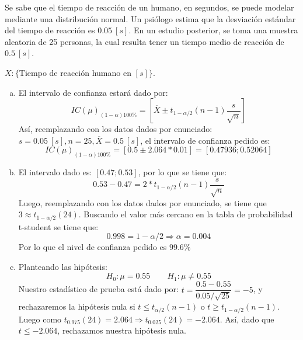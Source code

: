 
\addpoints
\question[30] Se sabe que el tiempo de reacción de un humano, en segundos, se puede modelar mediante una distribución normal. Un psiólogo estima que la desviación estándar del tiempo de reacción es $0.05\ [s]$. En un estudio posterior, se toma una muestra aleatoria de 25 personas, la cual resulta tener un tiempo medio de reacción de $0.5\ [s]$. 
\noaddpoints
{}

\begin{solution}

$X:\{$Tiempo de reacción humano en $[s]\}.$ 
\begin{enumerate}[a)]
\item El intervalo de confianza estará dado por: $$IC(\mu)_{(1-\alpha)100\%}=\left[ \overline{X}\pm t_{1-\alpha/2}(n-1)\dfrac{s}{\sqrt{n}}\right]$$ Así, reemplazando con los datos dados por enunciado: $s=0.05\ [s], n=25 ,\overline{X}=0.5\ [s]$, el intervalo de confianza pedido es: $$IC(\mu)_{(1-\alpha)100\%}=\left[0.5\pm 2.064 * 0.01\right]=[0.47936;0.52064]$$

\item El intervalo dado es: $[0.47;0.53]$, por lo que se tiene que:$$0.53-0.47=2*t_{1-\alpha/2}(n-1)\dfrac{s}{\sqrt{n}}$$Luego, reemplazando con los datos dados por enunciado, se tiene que $3\approx t_{1-\alpha/2}(24)$. Buscando el valor más cercano en la tabla de probabilidad t-student se tiene que:$$0.998=1-\alpha/2\Rightarrow \alpha=0.004$$Por lo que el nivel de confianza pedido es $99.6\%$

\item Planteando las hipótesis:
$$H_0: \mu=0.55 \hspace{25pt} H_1: \mu \neq 0.55$$
Nuestro estadístico de prueba está dado por: $t=\dfrac{0.5-0.55}{0.05/\sqrt{25}}=-5$, y rechazaremos la hipótesis nula si $t\leq t_{\alpha/2}(n-1)$ o $t\geq t_{1-\alpha/2}(n-1)$. Luego como $t_{0.975}(24)=2.064 \Rightarrow t_{0.025}(24)=-2.064$. Así, dado que $t\leq -2.064$, rechazamos nuestra hipótesis nula.
\end{enumerate}

\end{solution}
